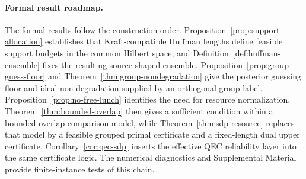 \documentclass[
 reprint,
 amsmath,amssymb,
 aps,
 pra,
 floatfix,
]{revtex4-2}
\begin{document}
\paragraph*{Formal result roadmap.}
\nocite{koashi2001compressibility,koashi2002operations,fowler2012surface,campbell2017roads,hausladen1994pretty,eldar2001quantum,barnum2002reversing}
The formal results follow the construction order. Proposition~\ref{prop:support-allocation} establishes that Kraft-compatible Huffman lengths define feasible support budgets in the common Hilbert space, and Definition~\ref{def:huffman-ensemble} fixes the resulting source-shaped ensemble. Proposition~\ref{prop:group-guess-floor} and Theorem~\ref{thm:group-nondegradation} give the posterior guessing floor and ideal non-degradation supplied by an orthogonal group label. Proposition~\ref{prop:no-free-lunch} identifies the need for resource normalization. Theorem~\ref{thm:bounded-overlap} then gives a sufficient condition within a bounded-overlap comparison model, while Theorem~\ref{thm:sdp-resource} replaces that model by a feasible grouped primal certificate and a fixed-length dual upper certificate. Corollary~\ref{cor:qec-sdp} inserts the effective QEC reliability layer into the same certificate logic. The numerical diagnostics and Supplemental Material~\cite{supplemental_material} provide finite-instance tests of this chain.
\end{document}
